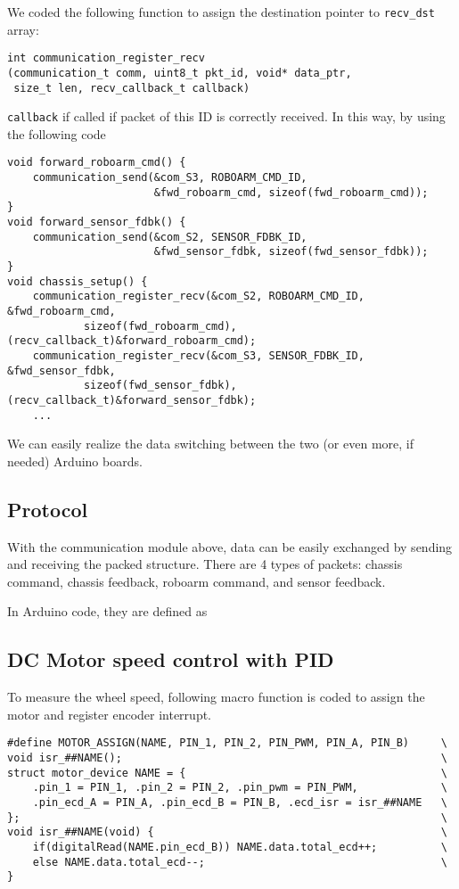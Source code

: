 We coded the following function to assign the destination pointer to \lstinline|recv_dst| array: 
\begin{lstlisting}
int communication_register_recv
(communication_t comm, uint8_t pkt_id, void* data_ptr, 
 size_t len, recv_callback_t callback)
\end{lstlisting}

\lstinline|callback| if called if packet of this ID is correctly received. 
In this way, by using the following code
\begin{lstlisting}
void forward_roboarm_cmd() {
    communication_send(&com_S3, ROBOARM_CMD_ID, 
                       &fwd_roboarm_cmd, sizeof(fwd_roboarm_cmd));
}
void forward_sensor_fdbk() {
    communication_send(&com_S2, SENSOR_FDBK_ID, 
                       &fwd_sensor_fdbk, sizeof(fwd_sensor_fdbk));
}
void chassis_setup() {
    communication_register_recv(&com_S2, ROBOARM_CMD_ID, &fwd_roboarm_cmd, 
            sizeof(fwd_roboarm_cmd), (recv_callback_t)&forward_roboarm_cmd);
    communication_register_recv(&com_S3, SENSOR_FDBK_ID, &fwd_sensor_fdbk, 
            sizeof(fwd_sensor_fdbk), (recv_callback_t)&forward_sensor_fdbk);
    ...
\end{lstlisting}
We can easily realize the data switching between the two (or even more, if needed) Arduino boards.
 

\subsection{Protocol}
With the communication module above, data can be easily exchanged by sending and receiving the packed structure. There are 4 types of packets: chassis command, chassis feedback, roboarm command, and sensor feedback. 

In Arduino code, they are defined as


\subsection{DC Motor speed control with PID}

To measure the wheel speed, following macro function is coded to assign the motor and register encoder interrupt.
\begin{lstlisting}
#define MOTOR_ASSIGN(NAME, PIN_1, PIN_2, PIN_PWM, PIN_A, PIN_B)     \
void isr_##NAME();                                                  \
struct motor_device NAME = {                                        \
    .pin_1 = PIN_1, .pin_2 = PIN_2, .pin_pwm = PIN_PWM,             \
    .pin_ecd_A = PIN_A, .pin_ecd_B = PIN_B, .ecd_isr = isr_##NAME   \
};                                                                  \
void isr_##NAME(void) {                                             \
    if(digitalRead(NAME.pin_ecd_B)) NAME.data.total_ecd++;          \
    else NAME.data.total_ecd--;                                     \
}
\end{lstlisting}

